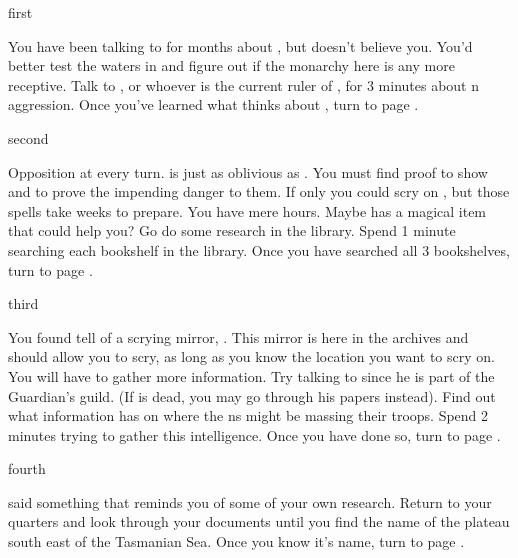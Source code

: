 \documentclass[greennotebook]{NeptuneBall}
\begin{document}

\startnotebook{\nIndianAggression{}}

\begin{page}{first}

You have been talking to \cPrince{} for months about \pIndia{}, but \cPrince{\they} doesn't believe you. You'd better test the waters in \pAtlantis{} and figure out if the monarchy here is any more receptive. Talk to \cKing{}, or whoever is the current ruler of \pAtlantis{}, for 3 minutes about \pIndia{}n aggression. Once you've learned what \pAtlantis{} thinks about \pIndia{}, turn to page .

\end{page}

\begin{page}{second}

Opposition at every turn. \pAtlantis{} is just as oblivious as \pPacifica{}. You must find proof to show \cPrince{} and \cKing{} to prove the impending danger to them. If only you could scry on \pIndia{}, but those spells take weeks to prepare. You have mere hours. Maybe \pAtlantis{} has a magical item that could help you? Go do some research in the library. Spend 1 minute searching each bookshelf in the library. Once you have searched all 3 bookshelves, turn to page .

\end{page}

\begin{page}{third}

You found tell of a scrying mirror, \iScryingMirror{}. This mirror is here in the archives and should allow you to scry, as long as you know the location you want to scry on. You will have to gather more information. Try talking to \cGeneral{} since he is part of the Guardian's guild. (If \cGeneral{\they} is dead, you may go through his papers instead). Find out what information \cGeneral{} has on where the \pIndia{}ns might be massing their troops. Spend 2 minutes trying to gather this intelligence. Once you have done so, turn to page .

\end{page}

\begin{page}{fourth} %

\cGeneral{} said something that reminds you of some of your own research. Return to your quarters and look through your documents until you find the name of the plateau south east of the Tasmanian Sea. Once you know it's name, turn to page .

\end{page}
\end{document}
